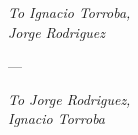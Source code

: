 \null\vfill
\begin{centering}

\emph{To Ignacio Torroba,}
\\
\emph{Jorge Rodriguez}

\vspace{2cm}
---
\vspace{2cm}

\emph{To Jorge Rodriguez,}
\\
\emph{Ignacio Torroba}

\end{centering}
\null\vfill